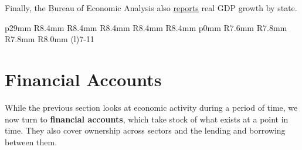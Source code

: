 \begin{minipage}{0.76\textwidth} 
\small Finally, the Bureau of Economic Analysis also \href{https://www.bea.gov/data/gdp/gdp-state}{reports} real GDP growth by state.  
\end{minipage}
\vspace{1.5mm}

\vspace*{-2.8mm}

 \setlength{\tabcolsep}{2.5pt} \color{black!90}
		{\renewcommand{\arraystretch}{1.48}
		 \begin{tabular}{p{29mm} R{8.4mm} R{8.4mm} R{8.4mm} R{8.4mm} R{8.4mm} p{0mm} R{7.6mm} R{7.8mm} R{7.8mm} R{8.0mm}}
		\cmidrule(l){7-11}\addlinespace[-0.5mm]
		 \hline
		\end{tabular}}\vspace{-1.5mm}	
		
\newpage
%
%
\hypertarget{ofa}{\label{ofa}}
\section*{Financial Accounts} \thispagestyle{sectpage}
\begin{minipage}{0.76\textwidth}  
\vspace*{-1.5mm}

\small While the previous section looks at economic activity during a period of time, we now turn to \textbf{financial accounts}, which take stock of what exists at a point in time. They also cover ownership across sectors and the lending and borrowing between them. 
\end{minipage}
\vspace*{-1.5mm}

